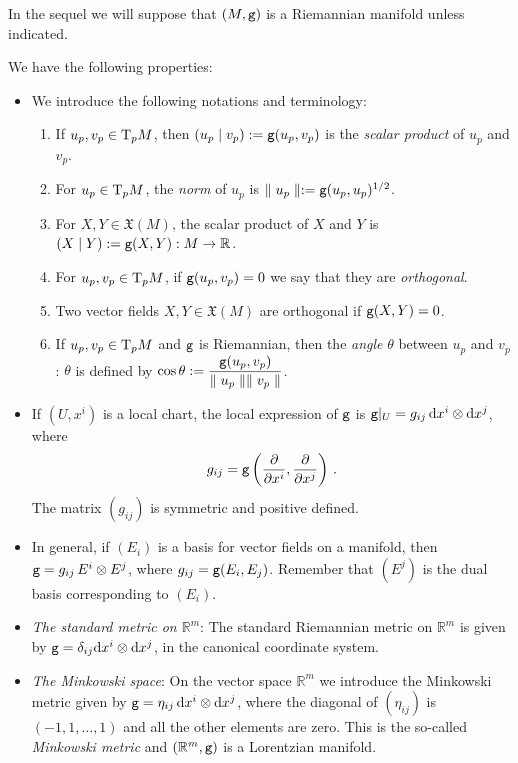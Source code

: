 \documentclass[12pt]{report}
\def\vf{\mathfrak X}
\def\d{{\rm d}}
\def\Real{\mathbb{R}}
\def\Tan{{\rm T}}
\begin{document}
In the sequel we will suppose that $(M,{\tt g})$ is a Riemannian manifold unless indicated.

We have the following properties:
\begin{itemize}
\item
We introduce the following notations and terminology:
\begin{enumerate}
  \item 
  If $u_p,v_p\in\Tan_p M$, then $(u_p\mid v_p):={\tt g}(u_p,v_p)$ is the {\sl scalar product} of $u_p$ and $v_p$.
  \item 
  For  $u_p\in\Tan_p M$, the {\sl norm} of $u_p$ is $\parallel u_p\parallel:={\tt g}(u_p,u_p)^{1/2}$.
  \item 
  For $X,Y\in\vf(M)$, the scalar product of $X$ and $Y$ is $(X\mid Y):={\tt g}(X,Y):M\to \Real$.
  \item 
  For $u_p,v_p\in\Tan_p M$, if ${\tt g}(u_p,v_p)=0$ we say that they are {\sl orthogonal}.
  \item 
  Two vector fields $X,Y\in\vf(M)$ are orthogonal if ${\tt g}(X,Y)=0$.
  \item 
  If $u_p,v_p\in\Tan_p M$ and ${\tt g}$ is Riemannian, 
  then the {\sl angle} $\theta$ 
  between $u_p$ and $v_p$: $\theta$ is defined by 
  $\displaystyle\cos\theta:=
  \frac{{\tt g}(u_p,v_p)}{\parallel u_p\parallel\parallel v_p\parallel}$. 
\end{enumerate}
\item
If $(U,x^i)$ is a local chart,
the local expression of ${\tt g}$ is 
${\tt g}|_U=g_{ij}\,\d x^i\otimes\d x^j$, where 
$$
g_{ij}={\tt g}\left(\frac{\partial}{\partial x^i},\frac{\partial}{\partial x^j}\right)\,.
$$
The matrix $(g_{ij})$ is symmetric and positive defined.
\item
In general, if $(E_i)$ is a basis for vector fields on a manifold, 
then ${\tt g}=g_{ij}\,E^i\otimes E^j$, where $g_{ij}={\tt g}(E_i,E_j)$. 
Remember that $(E^j)$ is the dual basis corresponding to $(E_i)$.
\item 
{\sl The standard metric on $\Real^m$}: 
The standard Riemannian metric on $\Real^m$ is given by 
${\tt g}=\delta_{ij}\d x^i\otimes\d x^j$,
in the canonical coordinate system.
\item
{\sl The Minkowski space}: 
On the vector space 
$\Real^m$ we introduce the Minkowski metric given by 
${\tt g}=\eta_{ij}\,\d x^i\otimes\d x^j$,
 where the diagonal of $(\eta_{ij})$ is $(-1,1,\ldots,1)$ and all the other elements are zero. 
 This is the so-called {\sl Minkowski metric}
  and $(\Real^m,{\tt g})$ is a Lorentzian manifold.

\end{itemize}
\end{document}
